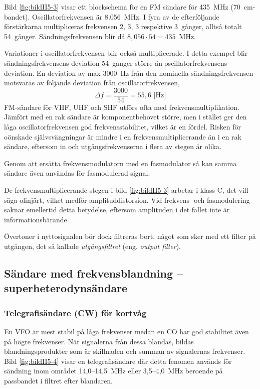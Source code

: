 Bild \ref{fig:bildII5-3} visar ett blockschema för en FM sändare för
\SI{435}{\mega\hertz} (70~cm-bandet).
Oscillatorfrekvensen är \SI{8,056}{\mega\hertz}.
I fyra av de efterföljande förstärkarna multipliceras frekvensen 2, 3, 3
respektive 3~gånger, alltså totalt 54~gånger.
Sändningsfrekvensen blir då \(8,056 \cdot 54 = 435\)~MHz.

Variationer i oscillatorfrekvensen blir också multiplicerade.
I detta exempel blir sändningsfrekvensens deviation 54~gånger större än
oscillatorfrekvensens deviation.
En deviation av max \SI{3000}{\hertz} från den nominella sändningsfrekvensen
motsvaras av följande deviation från oscillatorfrekvensen,
\[\Delta f = \frac{3000}{54} = 55,6\text{ [Hz]}\]
FM-sändare för VHF, UHF och SHF utförs ofta med
frekvensmultiplikation.
Jämfört med en rak sändare är komponentbehovet större, men i stället ger
den låga oscillatorfrekvensen god frekvensstabilitet, vilket är en fördel.
Risken för oönskade självsvängningar är mindre i en frekvensmultiplicerande
än i en rak sändare, eftersom in och utgångsfrekvenserna i flera av stegen är
olika.

Genom att ersätta frekvensmodulatorn med en fasmodulator så kan samma
sändare även användas för fasmodulerad signal.

De frekvensmultiplicerande stegen i bild \ref{fig:bildII5-3} arbetar i klass C,
det vill säga olinjärt, vilket medför amplituddistorsion.
Vid frekvens- och fasmodulering saknar emellertid detta betydelse, eftersom
amplituden i det fallet inte är informationsbärande.

Övertoner i nyttosignalen bör dock filtreras bort, något som sker med ett
filter på utgången, det så kallade \emph{utgångsfiltret}
(eng. \emph{output filter}).

\subsection{Sändare med frekvensblandning -- superheterodynsändare}

\subsubsection{Telegrafisändare (CW) för kortvåg}


En VFO är mest stabil på låga frekvenser medan en CO har god
stabilitet även på högre frekvenser.
När signalerna från dessa blandas, bildas blandningsprodukter som är
skillnaden och summan av signalernas frekvenser.
Bild \ref{fig:bildII5-4} visar en telegrafisändare där detta fenomen används
för sändning inom området 14,0--14,5~MHz eller 3,5--4,0~MHz beroende
på passbandet i filtret efter blandaren.


